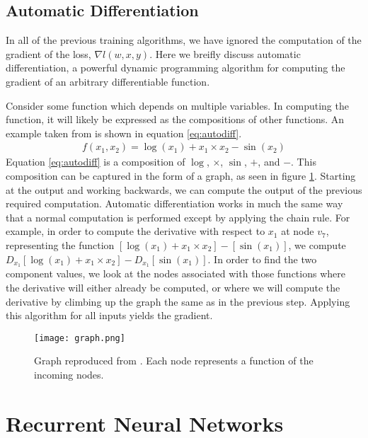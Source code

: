 \subsection{Automatic Differentiation}\label{sec:autodiff}
In all of the previous training algorithms, we have ignored the computation of the gradient of the loss, $\nabla l(w,x,y)$.  Here we breifly discuss automatic differentiation, a powerful dynamic programming algorithm for computing the gradient of an arbitrary differentiable function.

Consider some function which depends on multiple variables.  In computing the function, it will likely be expressed as the compositions of other functions.  An example taken from \cite{} is shown in equation \ref{eq:autodiff}.
\begin{align}\label{eq:autodiff}
f(x_1,x_2) = \log(x_1) + x_1\times x_2 - \sin(x_2)
\end{align}
Equation \ref{eq:autodiff} is a composition of $\log$, $\times$, $\sin$, $+$, and $-$.  This composition can be captured in the form of a graph, as seen in figure \ref{fig:graph}.  Starting at the output and working backwards, we can compute the output of the previous required computation.  Automatic differentiation works in much the same way that a normal computation is performed except by applying the chain rule.  For example, in order to compute the derivative with respect to $x_1$ at node $v_7$, representing the function $[\log(x_1) + x_1\times x_2] - [\sin(x_1)]$, we compute $D_{x_1}[\log(x_1) + x_1\times x_2] - D_{x_1}[\sin(x_1)]$.  In order to find the two component values, we look at the nodes associated with those functions where the derivative will either already be computed, or where we will compute the derivative by climbing up the graph the same as in the previous step.  Applying this algorithm for all inputs yields the gradient.

\begin{figure}
    \centering
    \texttt{[image: graph.png]}
    \caption{Graph reproduced from \cite{ab15}.  Each node represents a function of the incoming nodes.}
    \label{fig:graph}
\end{figure}

\section{Recurrent Neural Networks}\label{sec:rnn}

